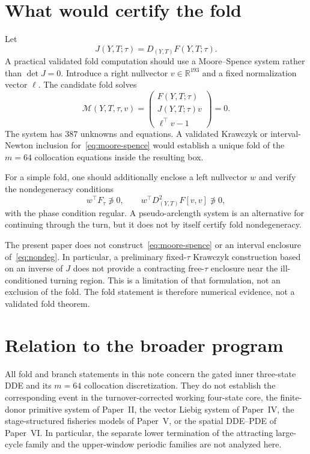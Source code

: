 \documentclass[11pt]{article}
\theoremstyle{definition}
\begin{document}
\section{What would certify the fold}

Let
\[
J(Y,T;\tau)=D_{(Y,T)}F(Y,T;\tau).
\]
A practical validated fold computation should use a Moore--Spence system rather than $\det J=0$. Introduce a right nullvector $v\in\mathbb R^{193}$ and a fixed normalization vector $\ell$. The candidate fold solves
\begin{equation}
\mathcal M(Y,T,\tau,v)=
\begin{pmatrix}
F(Y,T;\tau)\\
J(Y,T;\tau)v\\
\ell^\top v-1
\end{pmatrix}=0.
\label{eq:moore-spence}
\end{equation}
The system has $387$ unknowns and equations. A validated Krawczyk or interval-Newton inclusion for~\eqref{eq:moore-spence} would establish a unique fold of the $m=64$ collocation equations inside the resulting box.

For a simple fold, one should additionally enclose a left nullvector $w$ and verify the nondegeneracy conditions
\begin{equation}
w^\top F_\tau\not\ni0,
\qquad
w^\top D^2_{(Y,T)}F[v,v]\not\ni0,
\label{eq:nondeg}
\end{equation}
with the phase condition regular. A pseudo-arclength system is an alternative for continuing through the turn, but it does not by itself certify fold nondegeneracy.

The present paper does not construct~\eqref{eq:moore-spence} or an interval enclosure of~\eqref{eq:nondeg}. In particular, a preliminary fixed-$\tau$ Krawczyk construction based on an inverse of $J$ does not provide a contracting free-$\tau$ enclosure near the ill-conditioned turning region. This is a limitation of that formulation, not an exclusion of the fold. The fold statement is therefore numerical evidence, not a validated fold theorem.

\section{Relation to the broader program}

All fold and branch statements in this note concern the gated inner three-state DDE and its $m=64$ collocation discretization. They do not establish the corresponding event in the turnover-corrected working four-state core, the finite-donor primitive system of Paper~II, the vector Liebig system of Paper~IV, the stage-structured fisheries models of Paper~V, or the spatial DDE--PDE of Paper~VI. In particular, the separate lower termination of the attracting large-cycle family and the upper-window periodic families are not analyzed here.
\end{document}

